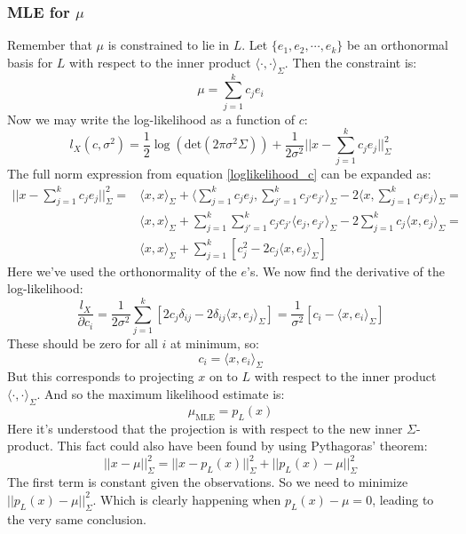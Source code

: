 \documentclass[12pt, a4paper]{article}
\begin{document}
\subsubsection{MLE for $\mu$}
Remember that $\mu$ is constrained to lie in $L$. Let $\{e_1,e_2,\cdots,e_k\}$ be an orthonormal basis for $L$ with respect to the inner product $\langle\cdot,\cdot\rangle_\Sigma$. Then the constraint is:
\begin{equation}
\mu=\sum_{j=1}^k c_j e_i
\end{equation}
Now we may write the log-likelihood as a function of $c$:
\begin{equation}
\label{loglikelihood_c}
l_X(c,\sigma^2)=\frac{1}{2}\log\left(\textrm{det}(2\pi\sigma^2\Sigma)\right)+\frac{1}{2\sigma^2}||x-\sum_{j=1}^k c_j e_j||^2_\Sigma
\end{equation}
The full norm expression from equation \ref{loglikelihood_c} can be expanded as:
\begin{align}
||x-\sum_{j=1}^k c_j e_j||^2_\Sigma=&\langle x,x\rangle_\Sigma+\langle\sum_{j=1}^k c_j e_j,\sum_{j'=1}^k c_{j'}e_{j'}\rangle_\Sigma-2\langle x,\sum_{j=1}^k c_j e_j\rangle_\Sigma=\\
&\langle x,x\rangle_\Sigma+\sum_{j=1}^k\sum_{j'=1}^k c_j c_{j'}\langle e_j,e_{j'}\rangle_\Sigma-2\sum_{j=1}^k c_j\langle x,e_j\rangle_\Sigma=\\
&\langle x,x\rangle_\Sigma+\sum_{j=1}^k\left[c_j^2-2c_j\langle x,e_j\rangle_\Sigma\right]
\end{align}
Here we've used the orthonormality of the $e$'s. We now find the derivative of the log-likelihood:
\begin{equation}
\frac{l_X}{\partial c_i}=\frac{1}{2\sigma^2}\sum_{j=1}^k\left[2c_j\delta_{ij}-2\delta_{ij}\langle x,e_j\rangle_\Sigma\right]=\frac{1}{\sigma^2}[c_i-\langle x,e_i\rangle_\Sigma]
\end{equation}
These should be zero for all $i$ at minimum, so:
\begin{equation}
c_i=\langle x,e_i\rangle_\Sigma\end{equation}
But this corresponds to projecting $x$ on to $L$ with respect to the inner product $\langle\cdot,\cdot\rangle_\Sigma$. And so the maximum likelihood estimate is:
\begin{equation}
\mu_{\textrm{MLE}}=p_L(x)
\end{equation}
Here it's understood that the projection is with respect to the new inner $\Sigma$-product. This fact could also have been found by using Pythagoras' theorem:
\begin{equation}
\label{pythagoras_mle}
||x-\mu||^2_\Sigma=||x-p_L(x)||^2_\Sigma+||p_L(x)-\mu||^2_\Sigma
\end{equation}
The first term is constant given the observations. So we need to minimize $||p_L(x)-\mu||^2_\Sigma$. Which is clearly happening when $p_L(x)-\mu=0$, leading to the very same conclusion.
\end{document}
